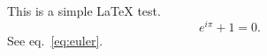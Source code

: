 \documentclass{article}
\begin{document}
This is a simple \LaTeX{} test.
\begin{equation}
  e^{i\pi} + 1 = 0 .
  \label{eq:euler}
\end{equation}
See eq.~\eqref{eq:euler}.
\end{document}
